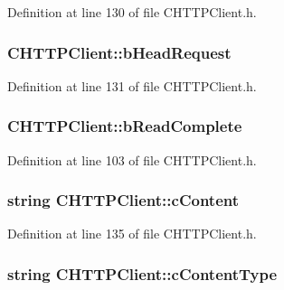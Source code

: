 \-Definition at line 130 of file \-C\-H\-T\-T\-P\-Client.\-h.

\hypertarget{class_c_h_t_t_p_client_a98a9f41337106c89ca4331d3ee067735}{
\subsubsection[{b\-Head\-Request}]{ {\bf \-C\-H\-T\-T\-P\-Client\-::b\-Head\-Request}}}\label{class_c_h_t_t_p_client_a98a9f41337106c89ca4331d3ee067735}


\-Definition at line 131 of file \-C\-H\-T\-T\-P\-Client.\-h.

\hypertarget{class_c_h_t_t_p_client_a9bb4f347e03b75be4adc9efe04ec1284}{
\subsubsection[{b\-Read\-Complete}]{ {\bf \-C\-H\-T\-T\-P\-Client\-::b\-Read\-Complete}}}\label{class_c_h_t_t_p_client_a9bb4f347e03b75be4adc9efe04ec1284}


\-Definition at line 103 of file \-C\-H\-T\-T\-P\-Client.\-h.

\hypertarget{class_c_h_t_t_p_client_a7c814dc76e1feb17be827cfa58246f5e}{
\subsubsection[{c\-Content}]{\setlength{\rightskip}{0pt plus 5cm}string {\bf \-C\-H\-T\-T\-P\-Client\-::c\-Content}}}\label{class_c_h_t_t_p_client_a7c814dc76e1feb17be827cfa58246f5e}


\-Definition at line 135 of file \-C\-H\-T\-T\-P\-Client.\-h.

\hypertarget{class_c_h_t_t_p_client_a2c8833f6431a9449a2ca776d3b75fdb9}{
\subsubsection[{c\-Content\-Type}]{\setlength{\rightskip}{0pt plus 5cm}string {\bf \-C\-H\-T\-T\-P\-Client\-::c\-Content\-Type}}}\label{class_c_h_t_t_p_client_a2c8833f6431a9449a2ca776d3b75fdb9}


